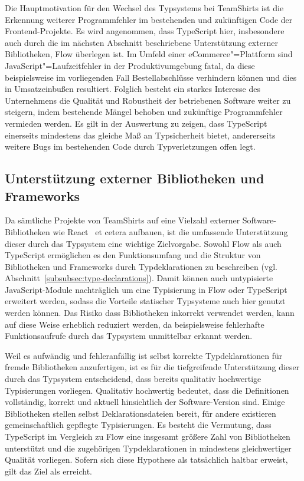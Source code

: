 Die Hauptmotivation für den Wechsel des Typsystems bei TeamShirts ist die Erkennung weiterer Programmfehler im bestehenden und zukünftigen Code der Frontend-Projekte. Es wird angenommen, dass TypeScript hier, insbesondere auch durch die im nächsten Abschnitt beschriebene Unterstützung externer Bibliotheken, Flow überlegen ist. Im Umfeld einer eCommerce"=Plattform sind JavaScript"=Laufzeitfehler in der Produktivumgebung fatal, da diese beispielsweise im vorliegenden Fall Bestellabschlüsse verhindern können und dies in Umsatzeinbußen resultiert. Folglich besteht ein starkes Interesse des Unternehmens die Qualität und Robustheit der betriebenen Software weiter zu steigern, indem bestehende Mängel behoben und zukünftige Programmfehler vermieden werden. Es gilt in der Auswertung zu zeigen, dass TypeScript einerseits mindestens das gleiche Maß an Typsicherheit bietet, andererseits weitere Bugs im bestehenden Code durch Typverletzungen offen legt.

\subsection{Unterstützung externer Bibliotheken und Frameworks}

Da sämtliche Projekte von TeamShirts auf eine Vielzahl externer Software-Bibliotheken wie React~\autocite{SOFTWARE:REACT} et cetera aufbauen, ist die umfassende Unterstützung dieser durch das Typsystem eine wichtige Zielvorgabe. Sowohl Flow als auch TypeScript ermöglichen es den Funktionsumfang und die Struktur von Bibliotheken und Frameworks durch Typdeklarationen zu beschreiben (vgl. Abschnitt~\ref{subsubsec:type-declarations}). Damit können auch untypisierte JavaScript-Module nachträglich um eine Typisierung in Flow oder TypeScript erweitert werden, sodass die Vorteile statischer Typsysteme auch hier genutzt werden können. Das Risiko dass Bibliotheken inkorrekt verwendet werden, kann auf diese Weise erheblich reduziert werden, da beispielsweise fehlerhafte Funktionsaufrufe durch das Typsystem unmittelbar erkannt werden.

Weil es aufwändig und fehleranfällig ist selbst korrekte Typdeklarationen für fremde Bibliotheken anzufertigen, ist es für die tiefgreifende Unterstützung dieser durch das Typsystem entscheidend, dass bereits qualitativ hochwertige Typisierungen vorliegen. Qualitativ hochwertig bedeutet, dass die Definitionen vollständig, korrekt und aktuell hinsichtlich der Software-Version sind. Einige Bibliotheken stellen selbst Deklarationsdateien bereit, für andere existieren gemeinschaftlich gepflegte Typisierungen. Es besteht die Vermutung, dass TypeScript im Vergleich zu Flow eine insgesamt größere Zahl von Bibliotheken unterstützt und die zugehörigen Typdeklarationen in mindestens gleichwertiger Qualität vorliegen. Sofern sich diese Hypothese als tatsächlich haltbar erweist, gilt das Ziel als erreicht.

